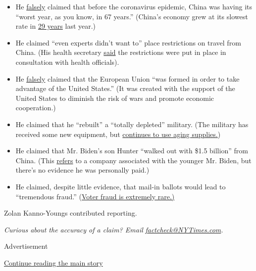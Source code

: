 \begin{itemize}
\item
  He
  \href{https://www.nytimes3xbfgragh.onion/2019/09/04/us/politics/fact-checking-trump-china.html}{falsely}
  claimed that before the coronavirus epidemic, China was having its
  ``worst year, as you know, in 67 years.'' (China's economy grew at its
  slowest rate in
  \href{https://www.ft.com/content/62524508-3825-11ea-a6d3-9a26f8c3cba4}{29
  years} last year.)
\item
  He claimed ``even experts didn't want to'' place restrictions on
  travel from China. (His health secretary
  \href{https://www.nytimes3xbfgragh.onion/interactive/2020/03/18/us/trump-coronavirus-statements-timeline.html}{said}
  the restrictions were put in place in consultation with health
  officials).
\item
  He
  \href{https://www.nytimes3xbfgragh.onion/2018/10/15/us/politics/fact-check-trump-european-union.html}{falsely}
  claimed that the European Union ``was formed in order to take
  advantage of the United States.'' (It was created with the support of
  the United States to diminish the risk of wars and promote economic
  cooperation.)
\item
  He claimed that he ``rebuilt'' a ``totally depleted'' military. (The
  military has received some new equipment, but
  \href{https://www.nytimes3xbfgragh.onion/2020/06/13/us/politics/fact-check-trump-military-west-point-speech.html}{continues
  to use aging supplies.})
\item
  He claimed that Mr. Biden's son Hunter ``walked out with \$1.5
  billion'' from China. (This
  \href{https://www.nytimes3xbfgragh.onion/2019/10/03/us/politics/hunter-biden-china.html}{refers}
  to a company associated with the younger Mr. Biden, but there's no
  evidence he was personally paid.)
\item
  He claimed, despite little evidence, that mail-in ballots would lead
  to ``tremendous fraud.''
  (\href{https://www.nytimes3xbfgragh.onion/article/mail-in-vote-fraud-ballot.html}{Voter
  fraud is extremely rare.)}
\end{itemize}

Zolan Kanno-Youngs contributed reporting.

\emph{Curious about the accuracy of a claim? Email}
\href{mailto:factcheck@NYTimes.com}{\emph{factcheck@NYTimes.com}}\emph{.}

Advertisement

\protect\hyperlink{after-bottom}{Continue reading the main story}

